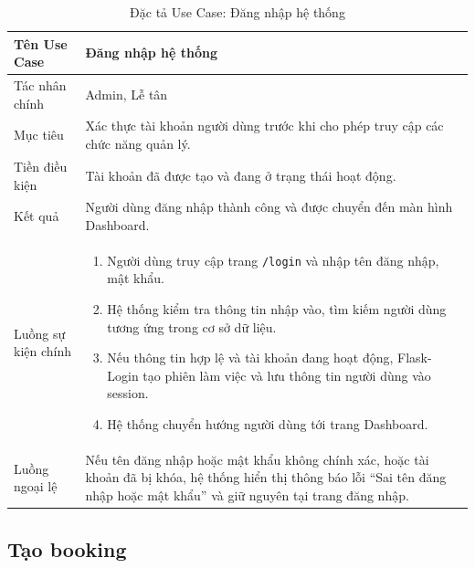 \documentclass[13pt,a4paper]{extreport}
\begin{document}
\begin{table}[H]
\centering
\caption{Đặc tả Use Case: Đăng nhập hệ thống}
\label{tab:uc-login}
\begin{tabular}{p{4cm}p{10cm}}
\hline
Tên Use Case & Đăng nhập hệ thống\\
\hline
Tác nhân chính & Admin, Lễ tân\\
Mục tiêu & Xác thực tài khoản người dùng trước khi cho phép truy cập các chức năng quản lý.\\
Tiền điều kiện & Tài khoản đã được tạo và đang ở trạng thái hoạt động.\\
Kết quả & Người dùng đăng nhập thành công và được chuyển đến màn hình Dashboard.\\
\hline
Luồng sự kiện chính &
\begin{enumerate}
\item Người dùng truy cập trang \texttt{/login} và nhập tên đăng nhập, mật khẩu.
\item Hệ thống kiểm tra thông tin nhập vào, tìm kiếm người dùng tương ứng trong cơ sở dữ liệu.
\item Nếu thông tin hợp lệ và tài khoản đang hoạt động, Flask-Login tạo phiên làm việc và lưu thông tin người dùng vào session.
\item Hệ thống chuyển hướng người dùng tới trang Dashboard.
\end{enumerate}\\
\hline
Luồng ngoại lệ &
Nếu tên đăng nhập hoặc mật khẩu không chính xác, hoặc tài khoản đã bị khóa, hệ thống hiển thị thông báo lỗi ``Sai tên đăng nhập hoặc mật khẩu'' và giữ nguyên tại trang đăng nhập.\\
\hline
\end{tabular}
\end{table}

\subsection*{Tạo booking}
\end{document}
